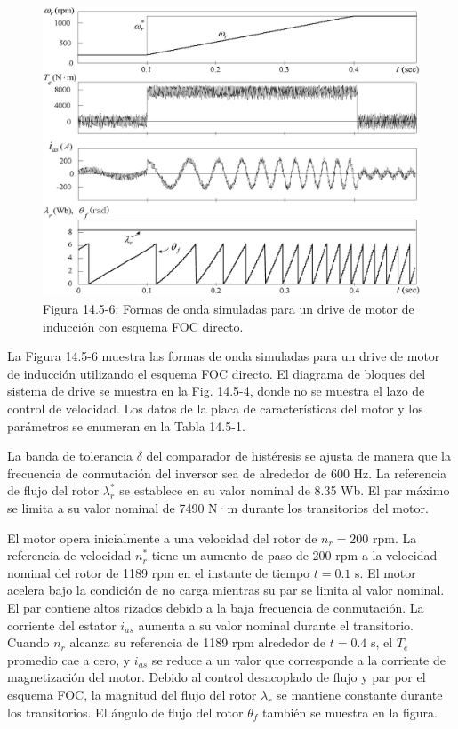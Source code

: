 \documentclass[letterpaper,12pt]{article}
\begin{document}
\begin{figure}[ht]
\centering
\includegraphics[scale=0.8]{graficos/img18.jpg}
\caption{Figura 14.5-6: Formas de onda simuladas para un drive de motor de inducción con esquema FOC directo.}
\end{figure}
\FloatBarrier

La Figura 14.5-6 muestra las formas de onda simuladas para un drive de motor de inducción utilizando el esquema FOC directo. El diagrama de bloques del sistema de drive se muestra en la Fig. 14.5-4, donde no se muestra el lazo de control de velocidad. Los datos de la placa de características del motor y los parámetros se enumeran en la Tabla 14.5-1.

La banda de tolerancia $\delta$ del comparador de histéresis se ajusta de manera que la frecuencia de conmutación del inversor sea de alrededor de 600 Hz. La referencia de flujo del rotor $\lambda_r^*$ se establece en su valor nominal de 8.35 Wb. El par máximo se limita a su valor nominal de 7490 N·m durante los transitorios del motor.

El motor opera inicialmente a una velocidad del rotor de $n_r = 200$ rpm. La referencia de velocidad $n_r^*$ tiene un aumento de paso de 200 rpm a la velocidad nominal del rotor de 1189 rpm en el instante de tiempo $t = 0.1$ s. El motor acelera bajo la condición de no carga mientras su par se limita al valor nominal. El par contiene altos rizados debido a la baja frecuencia de conmutación. La corriente del estator $i_{as}$ aumenta a su valor nominal durante el transitorio. Cuando $n_r$ alcanza su referencia de 1189 rpm alrededor de $t = 0.4$ s, el $T_e$ promedio cae a cero, y $i_{as}$ se reduce a un valor que corresponde a la corriente de magnetización del motor. Debido al control desacoplado de flujo y par por el esquema FOC, la magnitud del flujo del rotor $\lambda_r$ se mantiene constante durante los transitorios. El ángulo de flujo del rotor $\theta_f$ también se muestra en la figura.
\end{document}

